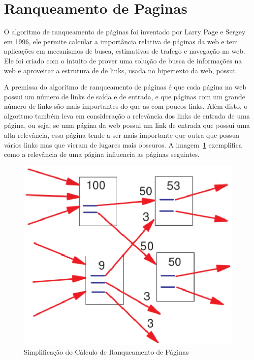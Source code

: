\section{Ranqueamento de Paginas}
O algoritmo de ranqueamento de páginas foi inventado por Larry Page e Sergey em
1996, ele permite calcular a importância relativa de páginas da web e tem aplicações
em mecanismos de busca, estimativas de trafego e navegação na web. Ele foi criado
com o intuito de prover uma solução de busca de informações na web e aproveitar
a estrutura de de links, usada no hipertexto da web, possui\cite{pageRank}.

A premissa do algoritmo de ranqueamento de páginas é que cada página na web
possui um número de links de saída e de entrada, e que páginas com um grande
número de links são mais importantes do que as com poucos links. Além disto,
o algoritmo também leva em consideração a relevância dos links de entrada
de uma página, ou seja, se uma página da web possui um link de entrada que
possui uma alta relevância, essa página tende a ser mais importante que outra
que possua vários links mas que vieram de lugares mais obscuros. A imagem~\ref{fig:page_rank}
exemplifica como a relevância de uma página influencia as páginas seguintes.

\begin{figure}[h]
    \centering
    \label{fig:page_rank}
        \includegraphics[keepaspectratio=true,scale=0.5]{figuras/page_rank.eps}
    \caption{Simplificação do Cálculo de Ranqueamento de Páginas}
\end{figure}

